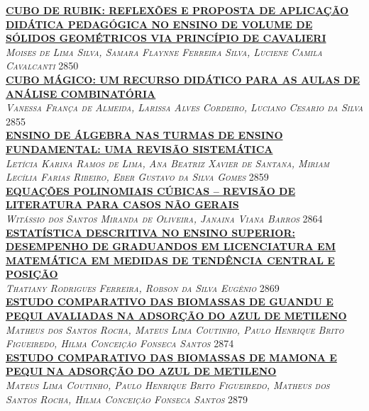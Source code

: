 \noindent \textsc{\hyperlink{trabalhos/249196.pdf.1}{\textbf{CUBO DE RUBIK: REFLEXÕES E PROPOSTA DE APLICAÇÃO DIDÁTICA PEDAGÓGICA NO ENSINO DE VOLUME DE SÓLIDOS GEOMÉTRICOS VIA PRINCÍPIO DE CAVALIERI}}}\\ 
\noindent \textsc{\textit{Moises de Lima Silva, Samara Flaynne Ferreira Silva, Luciene Camila Cavalcanti}} \hfill 2850\\ 

\noindent \textsc{\hyperlink{trabalhos/250313.pdf.1}{\textbf{CUBO MÁGICO: UM RECURSO DIDÁTICO PARA AS AULAS DE ANÁLISE COMBINATÓRIA}}}\\ 
\noindent \textsc{\textit{Vanessa França de Almeida, Larissa Alves Cordeiro, Luciano Cesario da Silva}} \hfill 2855\\ 

\noindent \textsc{\hyperlink{trabalhos/251387.pdf.1}{\textbf{ENSINO DE ÁLGEBRA NAS TURMAS DE ENSINO FUNDAMENTAL: UMA REVISÃO SISTEMÁTICA}}}\\ 
\noindent \textsc{\textit{Letícia Karina Ramos de Lima, Ana Beatriz Xavier de Santana, Miriam Lecília Farias Ribeiro, Eber Gustavo da Silva Gomes}} \hfill 2859\\ 

\noindent \textsc{\hyperlink{trabalhos/260531.pdf.1}{\textbf{EQUAÇÕES POLINOMIAIS CÚBICAS – REVISÃO DE LITERATURA PARA CASOS NÃO GERAIS}}}\\ 
\noindent \textsc{\textit{Witássio dos Santos Miranda de Oliveira, Janaina Viana Barros}} \hfill 2864\\ 

\noindent \textsc{\hyperlink{trabalhos/250236.pdf.1}{\textbf{ESTATÍSTICA DESCRITIVA NO ENSINO SUPERIOR: DESEMPENHO DE GRADUANDOS EM LICENCIATURA EM MATEMÁTICA EM MEDIDAS DE TENDÊNCIA CENTRAL E POSIÇÃO}}}\\ 
\noindent \textsc{\textit{Thatiany Rodrigues Ferreira, Robson da Silva Eugênio}} \hfill 2869\\ 

\noindent \textsc{\hyperlink{trabalhos/249597.pdf.1}{\textbf{ESTUDO COMPARATIVO DAS BIOMASSAS DE GUANDU E PEQUI AVALIADAS NA ADSORÇÃO DO AZUL DE METILENO}}}\\ 
\noindent \textsc{\textit{Matheus dos Santos Rocha, Mateus Lima Coutinho, Paulo Henrique Brito Figueiredo, Hilma Conceição Fonseca Santos}} \hfill 2874\\ 

\noindent \textsc{\hyperlink{trabalhos/250116.pdf.1}{\textbf{ESTUDO COMPARATIVO DAS BIOMASSAS DE MAMONA E PEQUI NA ADSORÇÃO DO AZUL DE METILENO}}}\\ 
\noindent \textsc{\textit{Mateus Lima Coutinho, Paulo Henrique Brito Figueiredo, Matheus dos Santos Rocha, Hilma Conceição Fonseca Santos}} \hfill 2879\\ 

